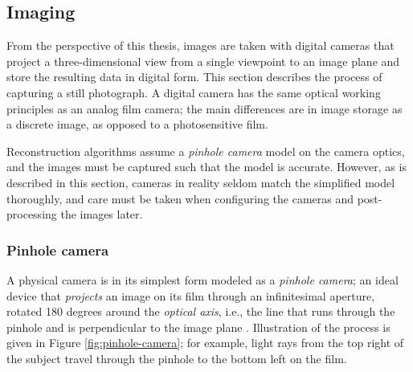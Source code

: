 
\subsection{Imaging} \label{sec:imaging} %

From the perspective of this thesis, images are taken with digital cameras that project a three-dimensional view from a single viewpoint to an image plane and store the resulting data in digital form.
This section describes the process of capturing a still photograph.
A digital camera has the same optical working principles as an analog film camera;
the main differences are in image storage as a discrete image, as opposed to a photosensitive film.

Reconstruction algorithms assume a \emph{pinhole camera} model on the camera optics, and the images must be captured such that the model is accurate.
However, as is described in this section, cameras in reality seldom match the simplified model thoroughly, and care must be taken when configuring the cameras and post-processing the images later.


\subsubsection{Pinhole camera} \label{sec:pinhole} %




A physical camera is in its simplest form modeled as a \emph{pinhole camera}; an ideal device that \emph{projects} an image on its film through an infinitesimal aperture, rotated 180 degrees around the \emph{optical axis}, i.e., the line that runs through the pinhole and is perpendicular to the image plane \cite{greenleaf1950photographic,kingslake1989history}.
Illustration of the process is given in Figure \ref{fig:pinhole-camera}; for example, light rays from the top right of the subject travel through the pinhole to the bottom left on the film.

